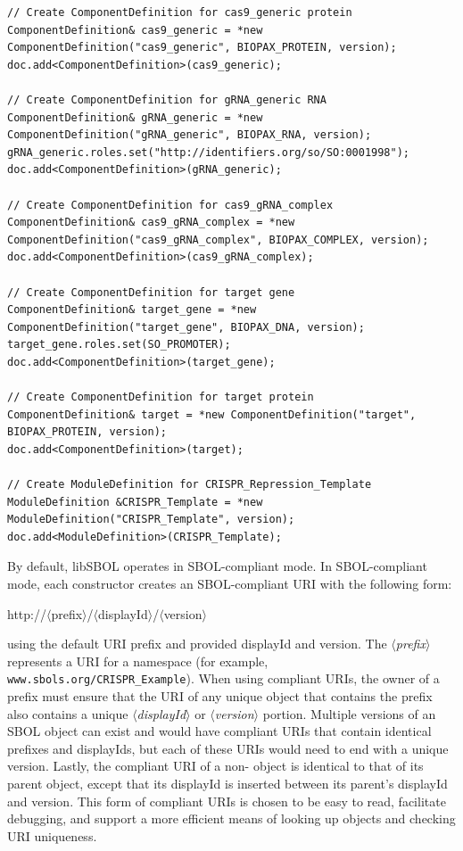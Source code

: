 \vspace{\abovedisplayskip}
\begin{minipage}{0.95\textwidth} 
\begin{lstlisting}
// Create ComponentDefinition for cas9_generic protein
ComponentDefinition& cas9_generic = *new ComponentDefinition("cas9_generic", BIOPAX_PROTEIN, version);
doc.add<ComponentDefinition>(cas9_generic);

// Create ComponentDefinition for gRNA_generic RNA
ComponentDefinition& gRNA_generic = *new ComponentDefinition("gRNA_generic", BIOPAX_RNA, version);
gRNA_generic.roles.set("http://identifiers.org/so/SO:0001998");
doc.add<ComponentDefinition>(gRNA_generic);

// Create ComponentDefinition for cas9_gRNA_complex
ComponentDefinition& cas9_gRNA_complex = *new ComponentDefinition("cas9_gRNA_complex", BIOPAX_COMPLEX, version);
doc.add<ComponentDefinition>(cas9_gRNA_complex);

// Create ComponentDefinition for target gene
ComponentDefinition& target_gene = *new ComponentDefinition("target_gene", BIOPAX_DNA, version);
target_gene.roles.set(SO_PROMOTER);
doc.add<ComponentDefinition>(target_gene);

// Create ComponentDefinition for target protein
ComponentDefinition& target = *new ComponentDefinition("target", BIOPAX_PROTEIN, version);
doc.add<ComponentDefinition>(target);

// Create ModuleDefinition for CRISPR_Repression_Template	
ModuleDefinition &CRISPR_Template = *new ModuleDefinition("CRISPR_Template", version);
doc.add<ModuleDefinition>(CRISPR_Template);
\end{lstlisting}
\end{minipage}

By default, libSBOL operates in SBOL-compliant mode. In SBOL-compliant mode, each constructor creates an SBOL-compliant URI with the following form:
\begin{center}
http://$\langle$prefix$\rangle$/$\langle$displayId$\rangle$/$\langle$version$\rangle$
\end{center}
using the default URI prefix and provided displayId and version. The \emph{$\langle$prefix$\rangle$} represents a URI for a namespace (for example, {\tt www.sbols.org/CRISPR\_Example}).  When using compliant URIs, the owner of a prefix must ensure that the URI of any unique  object that contains the prefix also contains a unique  \emph{$\langle$displayId$\rangle$} or \emph{$\langle$version$\rangle$} portion. Multiple versions of an SBOL object can exist and would have compliant URIs that contain identical prefixes and displayIds, but each of these URIs would need to end with a unique version. Lastly, the compliant URI of a non- object is identical to that of its parent object, except that its displayId is inserted between its parent's displayId and version. This form of compliant URIs is chosen to be easy to read, facilitate debugging, and support a more efficient means of looking up objects and checking URI uniqueness.

